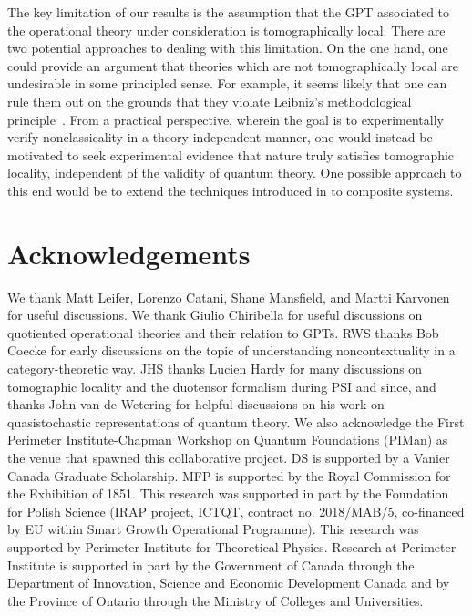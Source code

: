 \documentclass[onecolum,aps,groupedaddress,nofootinbib]{revtex4-2}
\begin{document}
The key limitation of our results is the assumption that the  GPT associated to the operational theory under consideration is tomographically local.
There are two potential approaches to dealing with this limitation. On the one hand, one could provide an argument that theories which are not tomographically local are undesirable in some principled sense. For example, it seems likely that one can rule them out on the grounds that they violate Leibniz's methodological principle~\cite{Leibniz}. From a practical perspective, wherein the goal is to experimentally verify nonclassicality in a theory-independent manner, one would instead be motivated to seek experimental evidence that nature truly satisfies tomographic locality, independent of the validity of quantum theory. One possible approach to this end would be to extend
 the techniques introduced in \cite{bootstraptomography} to composite systems.



\section*{Acknowledgements}
We thank Matt Leifer, Lorenzo Catani, Shane Mansfield, and Martti Karvonen for useful discussions.
We thank Giulio Chiribella for useful discussions on quotiented operational theories and their relation to GPTs.
RWS thanks Bob Coecke for early discussions on the topic of understanding noncontextuality in a category-theoretic way. JHS thanks Lucien Hardy for many discussions on tomographic locality and the duotensor formalism during PSI and since, and thanks John van de Wetering for helpful discussions on his work on quasistochastic representations of quantum theory. We also acknowledge the First Perimeter Institute-Chapman Workshop on Quantum Foundations (PIMan) as the venue that spawned this collaborative project.
DS is supported by a Vanier Canada Graduate Scholarship. MFP is supported by the Royal Commission for the Exhibition of 1851. This research was supported in part by the Foundation for Polish Science (IRAP project,
ICTQT, contract no. 2018/MAB/5, co-financed by EU
within Smart Growth Operational Programme). This research was supported by Perimeter Institute for Theoretical Physics. Research at Perimeter Institute is supported in part by the Government of Canada through the Department of Innovation, Science and Economic Development Canada and by the Province of Ontario through the Ministry of Colleges and Universities.



\end{document}
